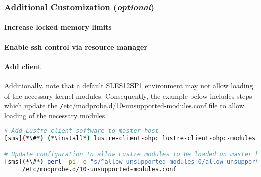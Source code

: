 \documentclass[letterpaper]{article}
\newcommand{\baseOS}{SLES12SP1}
\newcommand{\install}{zypper -n install}
\begin{document}

\subsubsection{Additional Customization ({\em optional})} \label{sec:addl_customizations}


\paragraph{Increase locked memory limits}
 

\paragraph{Enable ssh control via resource manager} 


\paragraph{Add \Lustre{} client} \label{sec:lustre_client}

Additionally, note that a default \baseOS{} environment may not allow loading of
the necessary \Lustre{} kernel modules. Consequently, the example below includes
steps which update the {\texttt /etc/modprobe.d/10-unsupported-modules.conf}
file to allow loading of the necessary modules.


\begin{lstlisting}[language=bash,keywords={},upquote=true]
# Add Lustre client software to master host
[sms](*\#*) (*\install*) lustre-client-ohpc lustre-client-ohpc-modules

# Update configuration to allow Lustre modules to be loaded on master host
[sms](*\#*) perl -pi -e "s/^allow_unsupported_modules 0/allow_unsupported_modules 1/" \
     /etc/modprobe.d/10-unsupported-modules.conf
\end{lstlisting}
\end{document}
